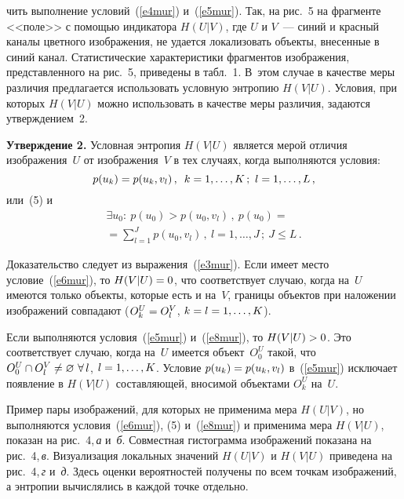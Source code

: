 \begin{multicols}{2}

\noindent
чить выполнение 
условий~(\ref{e4mur}) и~(\ref{e5mur}). Так, на рис.~5 на фрагменте <<поле>> с помощью 
индикатора $H(U\vert V)$, где $U$ и $V$~--- синий и красный каналы цветного 
изображения, не удается локализовать объекты, внесенные в синий канал. Статистические 
характеристики фрагментов изображения, представленного на рис.~5, приведены в табл.~1. 
В~этом случае в качестве меры различия предлагается использовать условную энтропию 
$H(V\vert U)$. Условия, при которых $H(V\vert U)$ можно использовать в качестве меры 
различия, задаются утверждением~2. 




\medskip

\noindent
\textbf{Утверждение 2.} Условная энтропия $H(V\vert U)$ является мерой отличия 
изображения~$U$ от изображения~$V$ в тех случаях, когда выполняются условия:
\begin{equation}
p(u_k) =p(u_k,v_l)\,,\enskip k=1, \ldots , K\,;\ l=1, \ldots ,L\,,
\label{e6mur}
\end{equation}
или~(5) и
\begin{multline}
\exists u_0:\ p(u_0)>p(u_0,v_l)\,,\ p(u_0)={}\\
{}=\sum\limits_{l=1}^J p(u_0,v_l)\,,\ l=1, \ldots , 
J\,;\ J\leq L\,.
\label{e8mur}
\end{multline}


  
  Доказательство следует из выражения~(\ref{e3mur}). Если имеет место 
условие~(\ref{e6mur}), то $H(V\vert U)\hm=0$, что соответствует случаю, когда на~$U$ 
имеются только объекты, которые есть и на~$V$, границы объектов при наложении 
изображений совпадают ($O_k^U\hm=O_l^V$, $k\hm=l\hm=1, \ldots , K$).
  
  Если выполняются условия~(\ref{e5mur}) и~(\ref{e8mur}), то $H(V\vert U)\hm >0$. Это 
соответствует случаю, когда на~$U$ имеется объект~$O_0^U$ такой, что $O_0^U\cap 
O_l^V\hm\not= \varnothing\ \forall\,l$, $l\hm=1, \ldots ,K$. Условие $p(u_k)\hm=p(u_k,v_l)$ 
в~(\ref{e5mur}) исключает появление в $H(V\vert U)$ составляющей, вносимой объектами 
$O_k^U$ на~$U$.
  
  Пример пары изображений, для которых не применима мера $H(U\vert V)$, но 
выполняются условия~(\ref{e6mur}), (5) и~(\ref{e8mur}) и применима мера $H(V\vert U)$, показан 
на рис.~4,\,\textit{а} и~\textit{б}. Совместная гистограмма изображений показана на 
рис.~4,\,\textit{в}. Визуализация локальных значений $H(U\vert V)$ и $H(V\vert U)$ 
приведена на рис.~4,\,\textit{г} и~\textit{д}. Здесь оценки вероятностей получены по всем 
точкам изоб\-ра\-же\-ний, а энтропии вычислялись в каждой точке отдельно.




\pagebreak

\end{multicols}

